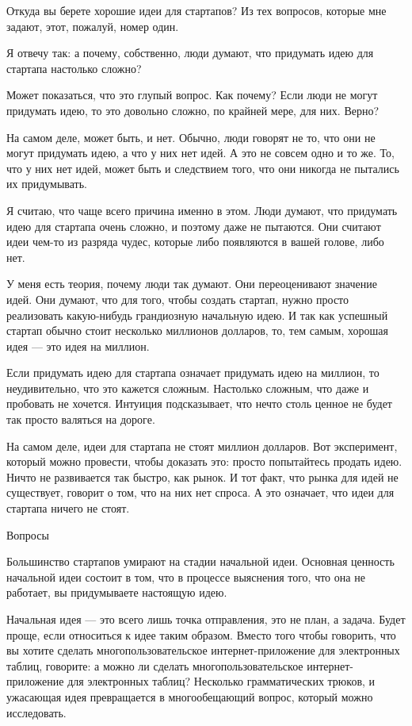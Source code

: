 \documentclass[ebook,12pt,oneside,openany]{memoir}
\begin{document}
\maketitle

Откуда вы берете хорошие идеи для стартапов? Из тех вопросов, которые
мне задают, этот, пожалуй, номер один.

Я отвечу так: а почему, собственно, люди думают, что придумать идею
для стартапа настолько сложно?

Может показаться, что это глупый вопрос. Как почему? Если люди не
могут придумать идею, то это довольно сложно, по крайней мере, для
них. Верно?

На самом деле, может быть, и нет. Обычно, люди говорят не то, что они
не могут придумать идею, а что у них нет идей. А это не совсем одно и
то же. То, что у них нет идей, может быть и следствием того, что они
никогда не пытались их придумывать.

Я считаю, что чаще всего причина именно в этом. Люди думают, что
придумать идею для стартапа очень сложно, и поэтому даже не пытаются.
Они считают идеи чем-то из разряда чудес, которые либо появляются в
вашей голове, либо нет.

У меня есть теория, почему люди так думают. Они переоценивают значение
идей. Они думают, что для того, чтобы создать стартап, нужно просто
реализовать какую-нибудь грандиозную начальную идею. И так как
успешный стартап обычно стоит несколько миллионов долларов, то, тем
самым, хорошая идея — это идея на миллион.

Если придумать идею для стартапа означает придумать идею на миллион,
то неудивительно, что это кажется сложным. Настолько сложным, что даже
и пробовать не хочется. Интуиция подсказывает, что нечто столь ценное
не будет так просто валяться на дороге.

На самом деле, идеи для стартапа не стоят миллион долларов. Вот
эксперимент, который можно провести, чтобы доказать это: просто
попытайтесь продать идею. Ничто не развивается так быстро, как рынок.
И тот факт, что рынка для идей не существует, говорит о том, что на
них нет спроса. А это означает, что идеи для стартапа ничего не стоят.

Вопросы

Большинство стартапов умирают на стадии начальной идеи. Основная
ценность начальной идеи состоит в том, что в процессе выяснения того,
что она не работает, вы придумываете настоящую идею.

Начальная идея — это всего лишь точка отправления, это не план, а
задача. Будет проще, если относиться к идее таким образом. Вместо того
чтобы говорить, что вы хотите сделать многопользовательское
интернет-приложение для электронных таблиц, говорите: а можно ли
сделать многопользовательское интернет-приложение для электронных
таблиц? Несколько грамматических трюков, и ужасающая идея превращается
в многообещающий вопрос, который можно исследовать.
\end{document}
